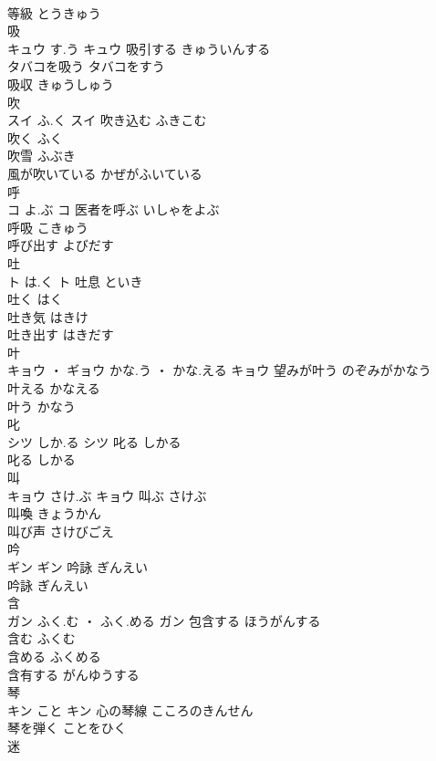 \documentclass[8pt]{extreport}
\begin{document}
\begin{CJK}{UTF8}{min}
\\	等級	とうきゅう	
\\	吸	
\\	キュウ	す.う	キュウ	吸引する	きゅういんする	
\\	タバコを吸う	タバコをすう	
\\	吸収	きゅうしゅう	
\\	吹	
\\	スイ	ふ.く	スイ	吹き込む	ふきこむ	
\\	吹く	ふく	
\\	吹雪	ふぶき	
\\	風が吹いている	かぜがふいている	
\\	呼	
\\	コ	よ.ぶ	コ	医者を呼ぶ	いしゃをよぶ	
\\	呼吸	こきゅう	
\\	呼び出す	よびだす	
\\	吐	
\\	ト	は.く	ト	吐息	といき	
\\	吐く	はく	
\\	吐き気	はきけ	
\\	吐き出す	はきだす	
\\	叶	
\\	キョウ ・ ギョウ	かな.う ・ かな.える	キョウ	望みが叶う	のぞみがかなう	
\\	叶える	かなえる	
\\	叶う	かなう	
\\	叱	
\\	シツ	しか.る	シツ	叱る	しかる	
\\	叱る	しかる	
\\	叫	
\\	キョウ	さけ.ぶ	キョウ	叫ぶ	さけぶ	
\\	叫喚	きょうかん	
\\	叫び声	さけびごえ	
\\	吟	
\\	ギン		ギン	吟詠	ぎんえい	
\\	吟詠	ぎんえい	
\\	含	
\\	ガン	ふく.む ・ ふく.める	ガン	包含する	ほうがんする	
\\	含む	ふくむ	
\\	含める	ふくめる	
\\	含有する	がんゆうする	
\\	琴	
\\	キン	こと	キン	心の琴線	こころのきんせん	
\\	琴を弾く	ことをひく	
\\	迷	

\end{CJK}
\end{document}
